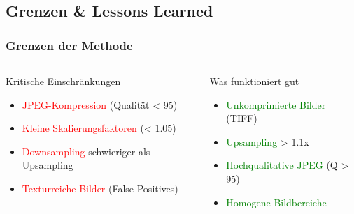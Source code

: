 \documentclass[11pt,t,usepdftitle=false,aspectratio=169]{beamer}
\begin{document}
\subsection{Grenzen \& Lessons Learned}

\begin{frame}
	\frametitle{Grenzen der Methode}
	
	\begin{columns}[T]
		\begin{column}{0.48\textwidth}
			\begin{alertblock}{Kritische Einschränkungen}
				\begin{itemize}
					\item \textcolor{red}{JPEG-Kompression} (Qualität < 95)
					\item \textcolor{red}{Kleine Skalierungsfaktoren} (< 1.05)
					\item \textcolor{red}{Downsampling} schwieriger als Upsampling
					\item \textcolor{red}{Texturreiche Bilder} (False Positives)
				\end{itemize}
			\end{alertblock}
		\end{column}
		\begin{column}{0.48\textwidth}
			\begin{exampleblock}{Was funktioniert gut}
				\begin{itemize}
					\item \textcolor{green}{Unkomprimierte Bilder} (TIFF)
					\item \textcolor{green}{Upsampling} > 1.1x
					\item \textcolor{green}{Hochqualitative JPEG} (Q > 95)
					\item \textcolor{green}{Homogene Bildbereiche}
				\end{itemize}
			\end{exampleblock}
		\end{column}
	\end{columns}
	
	\vspace{1em}
	
\end{frame}
\end{document}
